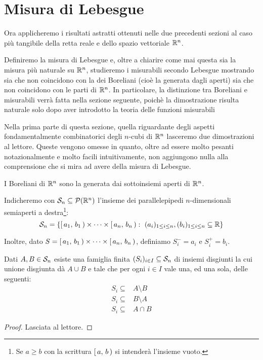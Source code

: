 \section{Misura di Lebesgue}
Ora applicheremo i risultati astratti ottenuti nelle due precedenti sezioni al caso più tangibile della retta reale e dello spazio vettoriale $\R^n$.

Definiremo la misura di Lebesgue e, oltre a chiarire come mai questa sia la misura più naturale su $\R^n$, studieremo i misurabili secondo Lebesgue mostrando sia che non coincidono con la \sigalg{} dei Boreliani (cioè la \sigalg{} generata dagli aperti) sia che non coincidono con le parti di $\R^n$.
In particolare, la distinzione tra Boreliani e misurabili verrà fatta nella sezione seguente, poichè la dimostrazione risulta naturale solo dopo aver introdotto la teoria delle funzioni misurabili

Nella prima parte di questa sezione, quella riguardante degli aspetti fondamentalmente combinatorici degli $n$-cubi di $\R^n$ lasceremo due dimostrazioni al lettore.
Queste vengono omesse in quanto, oltre ad essere molto pesanti notazionalmente e molto facili intuitivamente, non aggiungono nulla alla comprensione che si mira ad avere della misura di Lebesgue.

\begin{definition}\label{def:Boreliani}
	I Boreliani di $\R^n$ sono la \sigalg{} generata dai sottoinsiemi aperti di $\R^n$.
\end{definition}

\begin{definition}\label{def:LebesgueSemiaperti}
	Indicheremo con $\S_n\subseteq\mathcal P(\R^n)$ l'insieme dei parallelepipedi $n$-dimensionali semiaperti a destra\footnote{Se $a\ge b$ con la scrittura $\co{a}{b}$ si intenderà l'insieme vuoto.}:
	\begin{equation*}
		\S_n=\left\{\co{a_1}{b_1}\times\cdots\times\co{a_n}{b_n}:\ (a_i)_{1\le i\le n},(b_i)_{1\le i\le n}\subseteq \R\right\}
	\end{equation*}
	
	Inoltre, dato $S=\co{a_1}{b_1}\times\cdots\times\co{a_n}{b_n}$, definiamo $S^-_i=a_i$ e $S^+_i=b_i$.
\end{definition}

\begin{proposition}\label{prop:SpaccareUnioneSemiaperti}
	Dati $A,B\in\S_n$ esiste una famiglia finita $(S_i)_{i\in I}\subseteq\S_n$ di insiemi disgiunti la cui unione disgiunta dà $A\cup B$ e tale che per ogni $i\in I$ vale una, ed una sola, delle seguenti:
	\begin{align*}
		S_i\subseteq &A\setminus B\\
		S_i\subseteq &B\setminus A\\
		S_i\subseteq &A\cap B
	\end{align*}
\end{proposition}
\begin{proof}
	Lasciata al lettore.
\end{proof}


